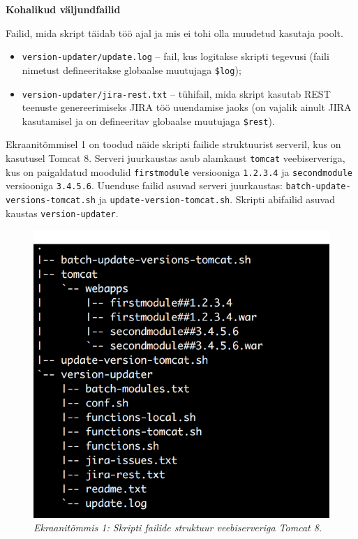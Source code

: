 \documentclass[12pt]{report}
\newcommand{\code}[1]{\texttt{#1}}
\begin{document}
  \textbf{Kohalikud väljundfailid}
  
  Failid, mida skript täidab töö ajal ja mis ei tohi olla muudetud kasutaja poolt.
  
  \begin{itemize}
    \item \code{version-updater/update.log} \--- fail, kus logitakse skripti tegevusi (faili nimetust defineeritakse globaalse muutujaga \code{\$log});
    \item \code{version-updater/jira-rest.txt} \--- tühifail, mida skript kasutab REST teenuste genereerimiseks JIRA töö uuendamise jaoks (on vajalik ainult JIRA kasutamisel ja on defineeritav globaalse muutujaga \code{\$rest}).
  \end{itemize}
  
  Ekraanitõmmisel 1 on toodud näide skripti failide struktuurist serveril, kus on kasutusel Tomcat 8. Serveri juurkaustas asub alamkaust \code{tomcat} veebiserveriga, kus on paigaldatud moodulid \code{firstmodule} versiooniga \code{1.2.3.4} ja \code{secondmodule} versiooniga \code{3.4.5.6}. Uuenduse failid asuvad serveri juurkaustas: \code{batch-update-versions-tomcat.sh} ja \code{update-version-tomcat.sh}. Skripti abifailid asuvad kaustas \code{version-updater}.
  
  \begin{figure}[H] 
    \begin{center}  
      \includegraphics{screenshots/file-structure-on-tomcat.png}
      \caption*{\textit{Ekraanitõmmis 1: Skripti failide struktuur veebiserveriga Tomcat 8.}}
      \end{center}
   \end{figure}
   
\end{document}
